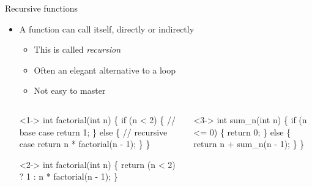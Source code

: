 \begin{frame}[fragile]{Recursive functions}

  \begin{itemize}
  \item A function can call itself, directly or indirectly
    \begin{itemize}[<.->]
    \item This is called \textit{recursion}
    \item Often an elegant alternative to a loop
    \item Not easy to master
    \end{itemize}

    \begin{columns}[t]
      \begin{column}{0.6\textwidth}
        \begin{codeblock}<1->{
int \alert{factorial}(int n) \{
  if (n < 2) \{  // base case
    return 1;
  \} else \{      // recursive case
    return n * \alert{factorial}(n - 1);
  \}
\}}\end{codeblock}
        \begin{codeblock}<2->{
int \alert{factorial}(int n) \{
  return (n < 2) ? 1
                 : n * \alert{factorial}(n - 1);
\}}\end{codeblock}
        
      \end{column}
      \begin{column}{0.4\textwidth}
        \begin{codeblock}<3->{
int \alert{sum_n}(int n)
\{
  if (n <= 0) \{
    return 0;
  \} else \{
    return n + \alert{sum_n}(n - 1);
  \}
\}}\end{codeblock}
      \end{column}
    \end{columns}

  \end{itemize}

\end{frame}

